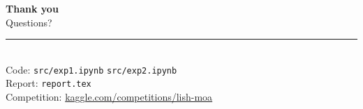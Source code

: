 \documentclass[aspectratio=169, 10pt]{beamer}
\begin{document}
\begin{frame}[plain]
  \begin{center}
    \vspace{2cm}
    {\LARGE \textbf{Thank you}}\\[1em]
    {\large Questions?}\\[2em]
    \rule{6cm}{0.4pt}\\[0.6em]
    \small
    Code: \texttt{src/exp1.ipynb} \quad \texttt{src/exp2.ipynb}\\
    Report: \texttt{report.tex}\\[0.4em]
    Competition: \href{https://www.kaggle.com/competitions/lish-moa}{kaggle.com/competitions/lish-moa}
  \end{center}
\end{frame}
\end{document}
